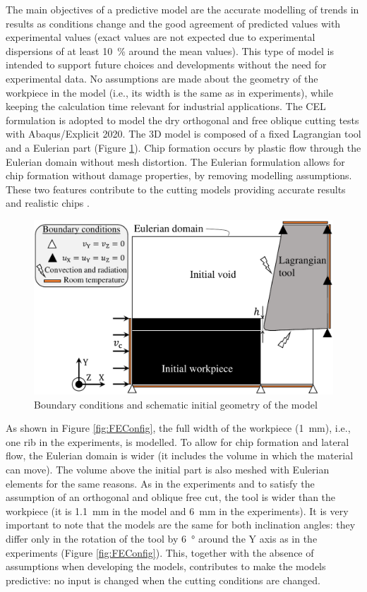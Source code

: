 \documentclass[preprint,12pt,times]{elsarticle}
\begin{document}
The main objectives of a predictive model are the accurate modelling of trends in results as conditions change and the good agreement of predicted values with experimental values (exact values are not expected due to experimental dispersions of at least \qty{10}{\%} around the mean values). This type of model is intended to support future choices and developments without the need for experimental data. No assumptions are made about the geometry of the workpiece in the model (i.e., its width is the same as in experiments), while keeping the calculation time relevant for industrial applications. The CEL formulation is adopted to model the dry orthogonal and free oblique cutting tests with Abaqus/Explicit 2020. The 3D model is composed of a fixed Lagrangian tool and a Eulerian part (Figure \ref{fig:BC}). Chip formation occurs by plastic flow through the Eulerian domain without mesh distortion. The Eulerian formulation allows for chip formation without damage properties, by removing modelling assumptions. These two features contribute to the cutting models providing accurate results and realistic chips \cite{ducobu_Application_2016}.

\begin{figure}[!h]
\centering
\includegraphics[width = 140 mm]{Figures/BC} %
\caption{Boundary conditions and schematic initial geometry of the model}
\label{fig:BC}
\end{figure}

As shown in Figure \ref{fig:FEConfig}, the full width of the workpiece (\qty{1}{\mm}), i.e., one rib in the experiments, is modelled. To allow for chip formation and lateral flow, the Eulerian domain is wider (it includes the volume in which the material can move). The volume above the initial part is also meshed with Eulerian elements for the same reasons. As in the experiments and to satisfy the assumption of an orthogonal and oblique free cut, the tool is wider than the workpiece (it is \qty{1.1}{\mm} in the model and \qty{6}{\mm} in the experiments). It is very important to note that the models are the same for both inclination angles: they differ only in the rotation of the tool by \qty{6}{\degree} around the Y axis as in the experiments (Figure \ref{fig:FEConfig}). This, together with the absence of assumptions when developing the models, contributes to make the models predictive: no input is changed when the cutting conditions are changed.
\end{document}
